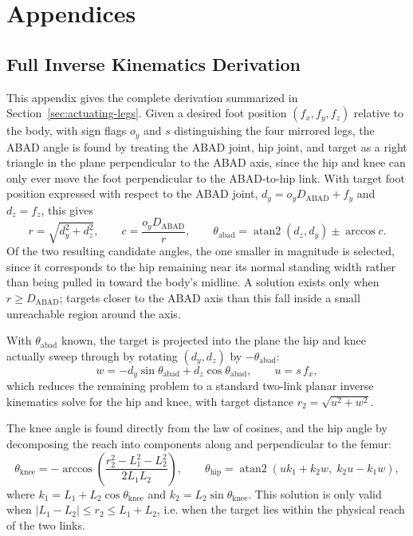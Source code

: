 \documentclass[12pt]{article}
\begin{document}
\newpage
\section{Appendices}
\label{sec:appendices}

\subsection{Full Inverse Kinematics Derivation}
\label{app:ik-derivation}
This appendix gives the complete derivation summarized in Section~\ref{sec:actuating-legs}. Given a desired foot position $(f_x, f_y, f_z)$ relative to the body, with sign flags $o_y$ and $s$ distinguishing the four mirrored legs, the ABAD angle is found by treating the ABAD joint, hip joint, and target as a right triangle in the plane perpendicular to the ABAD axis, since the hip and knee can only ever move the foot perpendicular to the ABAD-to-hip link. With target foot position expressed with respect to the ABAD joint, $d_y = o_y D_{\text{ABAD}} + f_y$ and $d_z = f_z$, this gives
\[
  r = \sqrt{d_y^2 + d_z^2}, \qquad
  c = \frac{o_y D_{\text{ABAD}}}{r}, \qquad
  \theta_{\text{abad}} = \operatorname{atan2}(d_z, d_y) \pm \arccos c .
\]
Of the two resulting candidate angles, the one smaller in magnitude is selected, since it corresponds to the hip remaining near its normal standing width rather than being pulled in toward the body's midline. A solution exists only when $r \ge D_{\text{ABAD}}$; targets closer to the ABAD axis than this fall inside a small unreachable region around the axis.

With $\theta_{\text{abad}}$ known, the target is projected into the plane the hip and knee actually sweep through by rotating $(d_y, d_z)$ by $-\theta_{\text{abad}}$:
\[
  w = -d_y \sin\theta_{\text{abad}} + d_z \cos\theta_{\text{abad}}, \qquad u = s\,f_x ,
\]
which reduces the remaining problem to a standard two-link planar inverse kinematics solve for the hip and knee, with target distance $r_2 = \sqrt{u^2+w^2}$.

The knee angle is found directly from the law of cosines, and the hip angle by decomposing the reach into components along and perpendicular to the femur:
\[
  \theta_{\text{knee}} = -\arccos\!\left(\frac{r_2^2 - L_1^2 - L_2^2}{2L_1L_2}\right), \qquad
  \theta_{\text{hip}} = \operatorname{atan2}(uk_1+k_2w,\; k_2u-k_1w),
\]
where $k_1 = L_1 + L_2\cos\theta_{\text{knee}}$ and $k_2 = L_2\sin\theta_{\text{knee}}$. This solution is only valid when $|L_1-L_2| \le r_2 \le L_1+L_2$, i.e. when the target lies within the physical reach of the two links.
\end{document}
